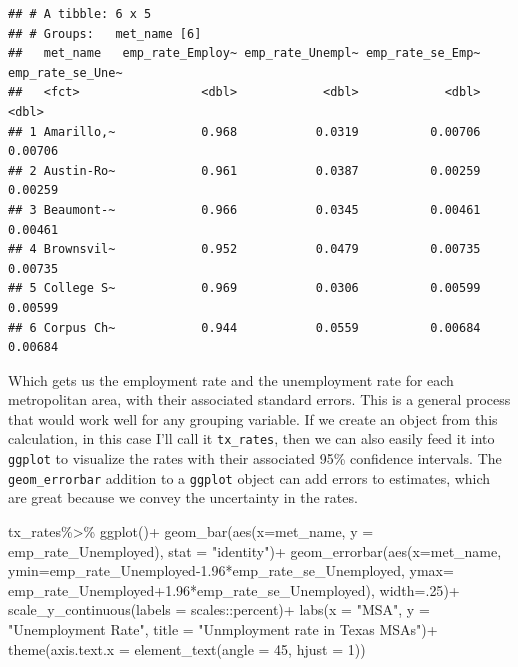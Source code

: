 \documentclass[
]{article}
\newenvironment{Shaded}{\begin{snugshade}}{\end{snugshade}}
\newcommand{\AttributeTok}[1]{\textcolor[rgb]{0.77,0.63,0.00}{#1}}
\newcommand{\DecValTok}[1]{\textcolor[rgb]{0.00,0.00,0.81}{#1}}
\newcommand{\FloatTok}[1]{\textcolor[rgb]{0.00,0.00,0.81}{#1}}
\newcommand{\FunctionTok}[1]{\textcolor[rgb]{0.00,0.00,0.00}{#1}}
\newcommand{\NormalTok}[1]{#1}
\newcommand{\SpecialCharTok}[1]{\textcolor[rgb]{0.00,0.00,0.00}{#1}}
\newcommand{\StringTok}[1]{\textcolor[rgb]{0.31,0.60,0.02}{#1}}
\begin{document}
\begin{verbatim}
## # A tibble: 6 x 5
## # Groups:   met_name [6]
##   met_name   emp_rate_Employ~ emp_rate_Unempl~ emp_rate_se_Emp~ emp_rate_se_Une~
##   <fct>                 <dbl>            <dbl>            <dbl>            <dbl>
## 1 Amarillo,~            0.968           0.0319          0.00706          0.00706
## 2 Austin-Ro~            0.961           0.0387          0.00259          0.00259
## 3 Beaumont-~            0.966           0.0345          0.00461          0.00461
## 4 Brownsvil~            0.952           0.0479          0.00735          0.00735
## 5 College S~            0.969           0.0306          0.00599          0.00599
## 6 Corpus Ch~            0.944           0.0559          0.00684          0.00684
\end{verbatim}

Which gets us the employment rate and the unemployment rate for each metropolitan area, with their associated standard errors. This is a general process that would work well for any grouping variable. If we create an object from this calculation, in this case I'll call it \texttt{tx\_rates}, then we can also easily feed it into \texttt{ggplot} to visualize the rates with their associated 95\% confidence intervals. The \texttt{geom\_errorbar} addition to a \texttt{ggplot} object can add errors to estimates, which are great because we convey the uncertainty in the rates.

\begin{Shaded}
\begin{Highlighting}[]
\NormalTok{tx\_rates}\SpecialCharTok{\%\textgreater{}\%}
  \FunctionTok{ggplot}\NormalTok{()}\SpecialCharTok{+}
  \FunctionTok{geom\_bar}\NormalTok{(}\FunctionTok{aes}\NormalTok{(}\AttributeTok{x=}\NormalTok{met\_name, }\AttributeTok{y =}\NormalTok{ emp\_rate\_Unemployed), }\AttributeTok{stat =} \StringTok{"identity"}\NormalTok{)}\SpecialCharTok{+}
  \FunctionTok{geom\_errorbar}\NormalTok{(}\FunctionTok{aes}\NormalTok{(}\AttributeTok{x=}\NormalTok{met\_name,}
                    \AttributeTok{ymin=}\NormalTok{emp\_rate\_Unemployed}\FloatTok{{-}1.96}\SpecialCharTok{*}\NormalTok{emp\_rate\_se\_Unemployed,}
                    \AttributeTok{ymax=}\NormalTok{ emp\_rate\_Unemployed}\FloatTok{+1.96}\SpecialCharTok{*}\NormalTok{emp\_rate\_se\_Unemployed),}
                \AttributeTok{width=}\NormalTok{.}\DecValTok{25}\NormalTok{)}\SpecialCharTok{+}
  \FunctionTok{scale\_y\_continuous}\NormalTok{(}\AttributeTok{labels =}\NormalTok{ scales}\SpecialCharTok{::}\NormalTok{percent)}\SpecialCharTok{+}
  \FunctionTok{labs}\NormalTok{(}\AttributeTok{x =} \StringTok{"MSA"}\NormalTok{, }
       \AttributeTok{y =} \StringTok{"Unemployment Rate"}\NormalTok{,}
       \AttributeTok{title =} \StringTok{"Unmployment rate in Texas MSAs"}\NormalTok{)}\SpecialCharTok{+}
  \FunctionTok{theme}\NormalTok{(}\AttributeTok{axis.text.x =} \FunctionTok{element\_text}\NormalTok{(}\AttributeTok{angle =} \DecValTok{45}\NormalTok{, }\AttributeTok{hjust =} \DecValTok{1}\NormalTok{))}
\end{Highlighting}
\end{Shaded}
\end{document}
